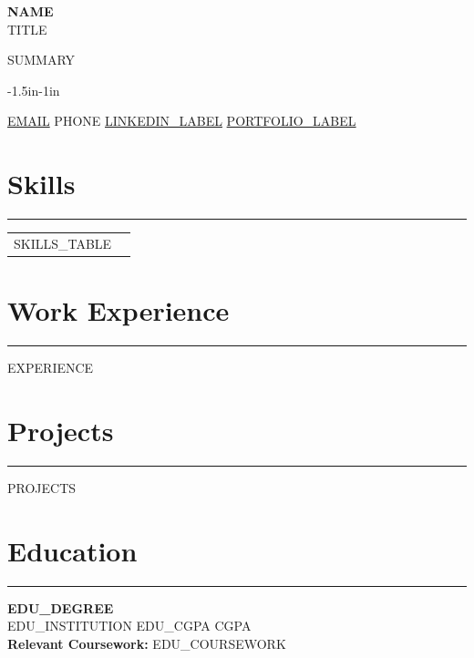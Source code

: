 \documentclass[10pt,a4paper]{article}
\begin{document}
\begin{center}
    {\Huge \textbf{{{NAME}}}}\\
    \vspace{2pt}
    {\large {{TITLE}}}
\end{center}

\vspace{3pt}
\noindent
{{SUMMARY}}

\begin{adjustwidth}{-1.5in}{-1in}
\noindent
\colorbox{gray!20}{%
  \parbox{\dimexpr\paperwidth+2in-2\fboxsep\relax}{%
    \centering
    \small \href{mailto:{{EMAIL}}}{{{EMAIL}}} \quad\quad
    {{PHONE}} \quad\quad
    \href{{{LINKEDIN_URL}}}{{{LINKEDIN_LABEL}}} \quad\quad
    \href{{{PORTFOLIO_URL}}}{{{PORTFOLIO_LABEL}}}
  }%
}
\end{adjustwidth}

\vspace{-6pt}
\section*{Skills}
\vspace{-10pt}
\noindent\rule{\textwidth}{0.4pt}

\noindent
\begin{tabular}{p{} p{}}
    {{SKILLS_TABLE}}
\end{tabular}

\vspace{-12pt}
\section*{Work Experience}
\vspace{-10pt}
\noindent\rule{\textwidth}{0.4pt}

{{EXPERIENCE}}

\vspace{-10pt}
\section*{Projects}
\vspace{-10pt}
\noindent\rule{\textwidth}{0.4pt}

{{PROJECTS}}

\vspace{-10pt}
\section*{Education}
\vspace{-10pt}
\noindent\rule{\textwidth}{0.4pt}

\textbf{{{EDU_DEGREE}}} \\
{{EDU_INSTITUTION}} \hfill {{EDU_CGPA}} CGPA \\
\textbf{Relevant Coursework:} {{EDU_COURSEWORK}}
\end{document}
